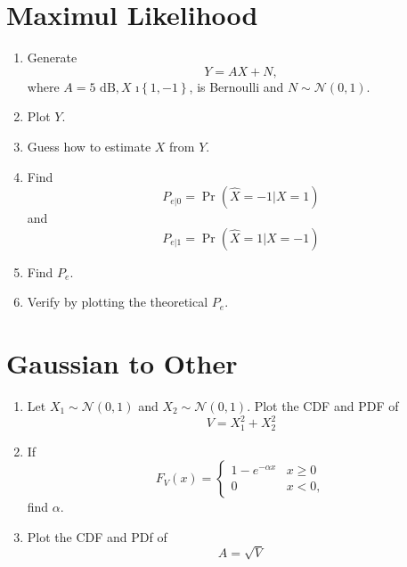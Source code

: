 \documentclass[journal,12pt,onecolumn]{IEEEtran}
\numberwithin{equation}{section}
\renewcommand\thesection{\arabic{section}}
\providecommand{\pr}[1]{\ensuremath{\Pr\left(#1\right)}}
\providecommand{\cbrak}[1]{\ensuremath{\left\{#1\right\}}}
\providecommand{\gauss}[2]{\mathcal{N}\ensuremath{\left(#1,#2\right)}}
\begin{document}
\section{Maximul Likelihood}
\begin{enumerate}[label=\thesection.\arabic*
        ,ref=\thesection.\theenumi]
    \item Generate
          \begin{equation}
              Y = AX+N,
          \end{equation}
          where $A = 5 \text{ dB}, X$ \i $\cbrak{1,-1}$,  is Bernoulli and $N \sim \gauss{0}{1}$.
    \item Plot $Y$.
    \item Guess how to estimate $X$ from $Y$.
    \item
          \label{ml-ch4_sim}
          Find
          \begin{equation}
              P_{e|0} = \pr{\hat{X} = -1|X=1}
          \end{equation}
          and
          \begin{equation}
              P_{e|1} = \pr{\hat{X} = 1|X=-1}
          \end{equation}
    \item Find $P_e$.
    \item
          Verify by plotting  the theoretical $P_e$.
\end{enumerate}
\section{Gaussian to Other}
\begin{enumerate}[label=\thesection.\arabic*
        ,ref=\thesection.\theenumi]
    \item
          Let $X_1 \sim  \gauss{0}{1}$ and $X_2 \sim  \gauss{0}{1}$. Plot the CDF and PDF of
          \begin{equation}
              V = X_1^2 + X_2^2
          \end{equation}
    \item
          If
          \begin{equation}
              F_{V}(x) =
              \begin{cases}
                  1 - e^{-\alpha x} & x \geq 0 \\
                  0                 & x < 0,
              \end{cases}
          \end{equation}
          find $\alpha$.
    \item
          \label{ch3_raleigh_sim}
          Plot the CDF and PDf of
          \begin{equation}
              A = \sqrt{V}
          \end{equation}
\end{enumerate}
\end{document}
